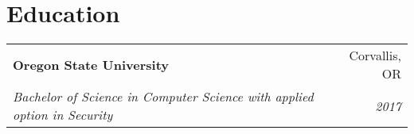 \documentclass[letterpaper,12pt]{article}
\makeatletter
\newcommand{\resumeSubheading}[4]{
	\vspace{-1pt}\item
	\begin{tabular*}{0.97\textwidth}{l@{\extracolsep{\fill}}r}
		\textbf{#1} & #2 \\
		\textit{\small#3} & \textit{\small #4} \\
	\end{tabular*}\vspace{-5pt}
}
\newcommand{\resumeSubHeadingListStart}{\begin{description}[leftmargin=*]}
\newcommand{\resumeSubHeadingListEnd}{\end{description}}
\makeatother
\begin{document}


\section{Education}
\resumeSubHeadingListStart
\resumeSubheading
{Oregon State University}{Corvallis, OR}
{Bachelor of Science in Computer Science with applied option in Security}{2017}
\resumeSubHeadingListEnd

	
\end{document}
